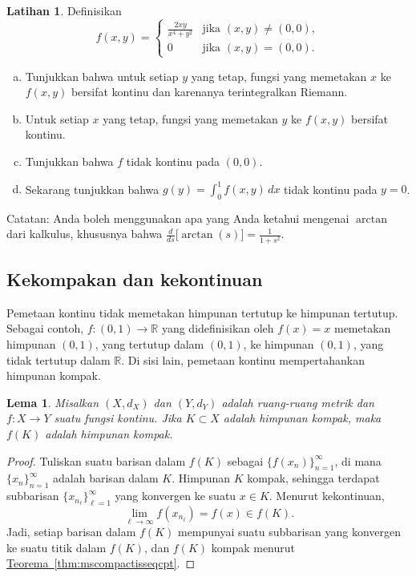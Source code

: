 \documentclass[12pt,openany]{book}
\newcommand{\R}{{\mathbb{R}}}
\theoremstyle{plain}
\newtheorem{lemma}[thm]{Lema}
\theoremstyle{remark}
\theoremstyle{definition}
\newenvironment{exbox}{%
    \def\FrameCommand{\vrule width 1pt \relax\hspace{10pt}}%
    \MakeFramed{\advance\hsize-\width\FrameRestore}%
}{%
    \endMakeFramed
}
\newenvironment{exparts}{%
    \leavevmode\begin{enumerate}[a),noitemsep,topsep=0pt,parsep=0pt,partopsep=0pt]
}{%
    \end{enumerate}
}
\theoremstyle{exercise}
\newtheorem{exercise}{Latihan}[section]
\theoremstyle{example}
\newcommand{\thmref}[1]{\hyperref[#1]{Teorema~\ref*{#1}}}
\begin{document}
\begin{exbox}
\begin{exercise}
Definisikan
\begin{equation*}
f(x,y) =
\begin{cases}
\frac{2xy}{x^4+y^2} & \text{jika } (x,y) \neq (0,0), \\
0 & \text{jika } (x,y) = (0,0) .
\end{cases}
\end{equation*}
\begin{exparts}
\item
Tunjukkan bahwa untuk setiap $y$ yang tetap, fungsi yang memetakan $x$ ke $f(x,y)$
bersifat kontinu dan karenanya terintegralkan Riemann.
\item
Untuk setiap $x$ yang tetap, fungsi yang memetakan $y$ ke $f(x,y)$ bersifat kontinu.
\item
Tunjukkan bahwa $f$ tidak kontinu pada $(0,0)$.
\item
Sekarang tunjukkan bahwa $g(y) = \int_0^1 f(x,y)\,dx$ tidak kontinu pada $y=0$.
\end{exparts}
Catatan: Anda boleh menggunakan apa yang Anda ketahui mengenai $\arctan$ dari kalkulus,
khususnya bahwa $\frac{d}{ds} \bigl[ \arctan(s) \bigr] = \frac{1}{1+s^2}$.
\end{exercise}
\end{exbox}


\subsection{Kekompakan dan kekontinuan}

Pemetaan kontinu tidak memetakan himpunan tertutup ke himpunan tertutup.  Sebagai contoh,
$f \colon (0,1) \to \R$ yang didefinisikan oleh $f(x) = x$ memetakan himpunan $(0,1)$, yang
tertutup dalam $(0,1)$, ke himpunan $(0,1)$, yang tidak tertutup dalam $\R$.
Di sisi lain, pemetaan kontinu mempertahankan himpunan kompak.

\begin{lemma} \label{lemma:continuouscompact}
Misalkan $(X,d_X)$ dan $(Y,d_Y)$ adalah ruang-ruang metrik
dan $f \colon X \to Y$ suatu fungsi kontinu.  Jika
$K \subset X$ adalah himpunan kompak, maka $f(K)$ adalah himpunan kompak.
\end{lemma}

\begin{proof}
Tuliskan
suatu barisan dalam $f(K)$ sebagai
$\bigl\{ f(x_n) \bigr\}_{n=1}^\infty$, di mana
$\{ x_n \}_{n=1}^\infty$ adalah barisan dalam $K$.  Himpunan $K$ kompak, sehingga
terdapat subbarisan
$\{ x_{n_\ell} \}_{\ell=1}^\infty$ yang konvergen ke suatu $x \in K$.
Menurut kekontinuan,
\begin{equation*}
\lim_{\ell\to\infty} f(x_{n_\ell}) = f(x) \in f(K) .
\end{equation*}
Jadi, setiap barisan dalam $f(K)$ mempunyai suatu subbarisan yang konvergen ke 
suatu titik dalam $f(K)$, dan $f(K)$ kompak menurut \thmref{thm:mscompactisseqcpt}.
\end{proof}
\end{document}
